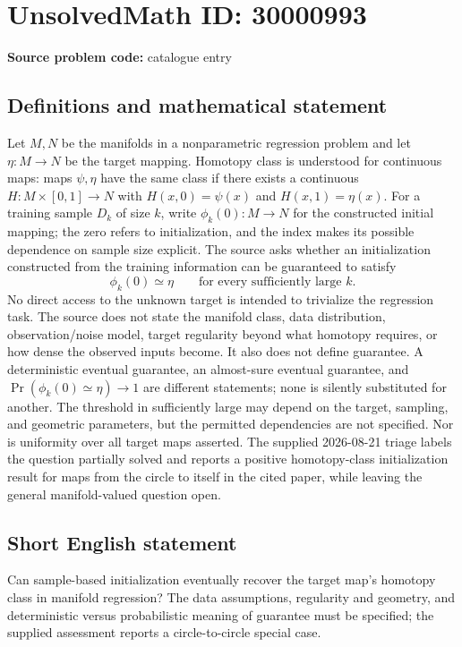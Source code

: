 \documentclass[11pt]{article}
\begin{document}
\section*{UnsolvedMath ID: 30000993}
\textbf{Source problem code:} catalogue entry
\subsection{Definitions and mathematical statement}
Let $M,N$ be the manifolds in a nonparametric regression problem and let $\eta:M\to N$ be the target mapping. Homotopy class is understood for continuous maps: maps $\psi,\eta$ have the same class if there exists a continuous $H:M\times[0,1]\to N$ with $H(x,0)=\psi(x)$ and $H(x,1)=\eta(x)$. For a training sample $D_k$ of size $k$, write $\phi_k(0):M\to N$ for the constructed initial mapping; the zero refers to initialization, and the index makes its possible dependence on sample size explicit. The source asks whether an initialization constructed from the training information can be guaranteed to satisfy \[\phi_k(0)\simeq\eta\qquad\text{for every sufficiently large }k.\] No direct access to the unknown target is intended to trivialize the regression task. The source does not state the manifold class, data distribution, observation/noise model, target regularity beyond what homotopy requires, or how dense the observed inputs become. It also does not define guarantee. A deterministic eventual guarantee, an almost-sure eventual guarantee, and $\Pr(\phi_k(0)\simeq\eta)\to1$ are different statements; none is silently substituted for another. The threshold in sufficiently large may depend on the target, sampling, and geometric parameters, but the permitted dependencies are not specified. Nor is uniformity over all target maps asserted. The supplied 2026-08-21 triage labels the question partially solved and reports a positive homotopy-class initialization result for maps from the circle to itself in the cited paper, while leaving the general manifold-valued question open.
\subsection{Short English statement}
Can sample-based initialization eventually recover the target map's homotopy class in manifold regression? The data assumptions, regularity and geometry, and deterministic versus probabilistic meaning of guarantee must be specified; the supplied assessment reports a circle-to-circle special case.
\end{document}

